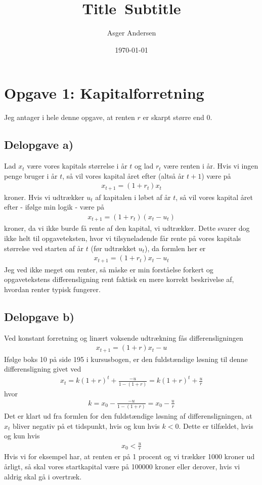 \documentclass[12pt]{article}
\title{
  Title\
  \large Subtitle
}
\author{Asger Andersen}
\date{\today}
\begin{document}
\section{Opgave 1: Kapitalforretning}

Jeg antager i hele denne opgave, at renten $r$ er skarpt større end 0.

\subsection{Delopgave a)}

Lad $x_t$ være vores kapitals størrelse i år $t$ og lad $r_t$ være renten i år. Hvis vi ingen penge bruger i år $t$, så vil vores kapital året efter (altså år $t+1$) være på 
\begin{align}
x_{t+1} = (1+r_t)x_t
\end{align}
kroner. Hvis vi udtrækker $u_t$ af kapitalen i løbet af år $t$, så vil vores kapital året efter - ifølge min logik - være på
\begin{align}
x_{t+1} = (1+r_t)(x_t - u_t)
\end{align}
kroner, da vi ikke burde få rente af den kapital, vi udtrækker. Dette svarer dog ikke helt til opgaveteksten, hvor vi tilsyneladende får rente på vores kapitals størrelse ved starten af år $t$ (før udtrækket $u_t$), da formlen her er
\begin{align}
x_{t+1} = (1+r_t)x_t - u_t
\end{align}
Jeg ved ikke meget om renter, så måske er min forståelse forkert og opgavetekstens differensligning rent faktisk en mere korrekt beskrivelse af, hvordan renter typisk fungerer.

\subsection{Delopgave b)} 

Ved konstant forretning og linært voksende udtrækning fås differensligningen
\begin{align}
x_{t+1} = (1+r)x_t - u
\end{align}
Ifølge boks 10 på side 195 i kursusbogen, er den fuldstændige løsning til denne differensligning givet ved
\begin{align}
x_t = k(1+r)^t + \frac{-u}{1 - (1+r)} = k(1+r)^t + \frac{u}{r}
\end{align}
hvor 
\begin{align}
k = x_0 - \frac{-u}{1 - (1+r)} = x_0 - \frac{u}{r}
\end{align}
Det er klart ud fra formlen for den fuldstændige løsning af differensligningen, at $x_t$ bliver negativ på et tidspunkt, hvis og kun hvis $k<0$. Dette er tilfældet, hvis og kun hvis
\begin{align}
x_0 < \frac{u}{r}
\end{align} 
Hvis vi for eksempel har, at renten er på 1 procent og vi trækker 1000 kroner ud årligt, så skal vores startkapital være på 100000 kroner eller derover, hvis vi aldrig skal gå i overtræk.
\end{document}
